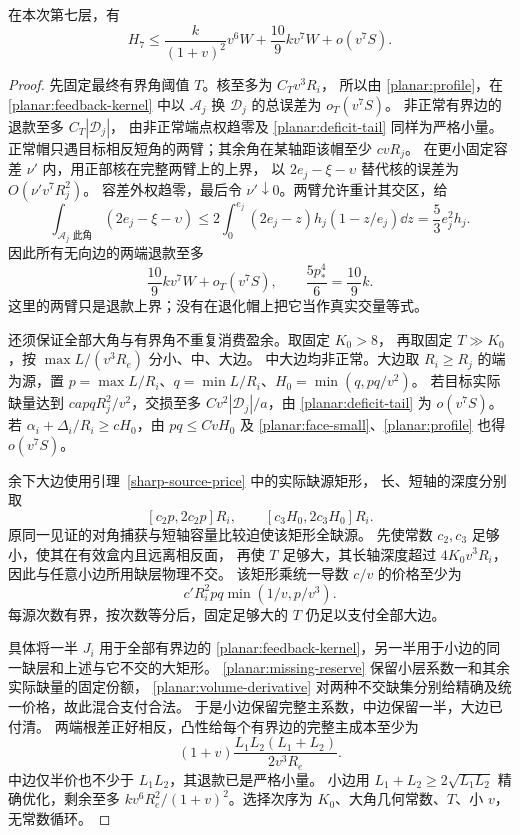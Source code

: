 \begin{lemma}[二维次阶局部价格]\label{planar:local-price}
在本次第七层，有
\begin{equation}\label{planar:price}
 H_7\le\frac{k}{(1+v)^2}v^6W+\frac{10}{9}kv^7W+o(v^7S).
\end{equation}
\end{lemma}
\begin{proof}
先固定最终有界角阈值 \(T\)。核至多为 \(C_Tv^3R_i\)，
所以由 \eqref{planar:profile}，在 \eqref{planar:feedback-kernel} 中以
\(\mathcal A_j\) 换 \(\mathscr D_j\) 的总误差为 \(o_T(v^7S)\)。
非正常有界边的退款至多 \(C_T|\mathscr D_j|\)，
由非正常端点权趋零及 \eqref{planar:deficit-tail} 同样为严格小量。
正常帽只遇目标相反短角的两臂；其余角在某轴距该帽至少 \(cvR_j\)。
在更小固定容差 \(\nu'\) 内，用正部核在完整两臂上的上界，
以 \(2e_j-\xi-\upsilon\) 替代核的误差为 \(O(\nu'v^7R_j^2)\)。
容差外权趋零，最后令 \(\nu'\downarrow0\)。两臂允许重计其交区，给
\[
 \int_{\mathcal A_j\text{ 此角}}(2e_j-\xi-\upsilon)
 \le2\int_0^{e_j}(2e_j-z)h_j(1-z/e_j)\dd z
 =\frac53e_j^2h_j.
\]
因此所有无向边的两端退款至多
\begin{equation}\label{planar:refund}
 \frac{10}{9}kv^7W+o_T(v^7S),
 \qquad \frac{5p_*^4}{6}=\frac{10}{9}k.
\end{equation}
这里的两臂只是退款上界；没有在退化帽上把它当作真实交量等式。

还须保证全部大角与有界角不重复消费盈余。取固定 \(K_0>8\)，
再取固定 \(T\gg K_0\)，按 \(\max L/(v^3R_e)\) 分小、中、大边。
中大边均非正常。大边取 \(R_i\ge R_j\) 的端为源，置
\(p=\max L/R_i\)、\(q=\min L/R_i\)、\(H_0=\min(q,pq/v^2)\)。
若目标实际缺量达到 \(c apqR_j^2/v^2\)，交损至多
\(Cv^2|\mathscr D_j|/a\)，由 \eqref{planar:deficit-tail} 为 \(o(v^7S)\)。
若 \(\alpha_i+\Delta_i/R_i\ge cH_0\)，由 \(pq\le CvH_0\) 及
\eqref{planar:face-small}、\eqref{planar:profile} 也得 \(o(v^7S)\)。

余下大边使用引理~\ref{sharp-source-price} 中的实际缺源矩形，
长、短轴的深度分别取
\[
 [c_2p,2c_2p]R_i,\qquad [c_3H_0,2c_3H_0]R_i.
\]
原同一见证的对角捕获与短轴容量比较迫使该矩形全缺源。
先使常数 \(c_2,c_3\) 足够小，使其在有效盒内且远离相反面，
再使 \(T\) 足够大，其长轴深度超过 \(4K_0v^3R_i\)，
因此与任意小边所用缺层物理不交。
该矩形乘统一导数 \(c/v\) 的价格至少为
\[
 c'R_i^2pq\min(1/v,p/v^3).
\]
每源次数有界，按次数等分后，固定足够大的 \(T\) 仍足以支付全部大边。

具体将一半 \(J_i\) 用于全部有界边的
\eqref{planar:feedback-kernel}，另一半用于小边的同一缺层和上述与它不交的大矩形。
\eqref{planar:missing-reserve} 保留小层系数一和其余实际缺量的固定份额，
\eqref{planar:volume-derivative} 对两种不交缺集分别给精确及统一价格，故此混合支付合法。
于是小边保留完整主系数，中边保留一半，大边已付清。
两端根差正好相反，凸性给每个有界边的完整主成本至少为
\[
 (1+v)\frac{L_1L_2(L_1+L_2)}{2v^3R_e}.
\]
中边仅半价也不少于 \(L_1L_2\)，其退款已是严格小量。
小边用 \(L_1+L_2\ge2\sqrt{L_1L_2}\) 精确优化，剩余至多
\(kv^6R_e^2/(1+v)^2\)。选择次序为 \(K_0\)、大角几何常数、\(T\)、小 \(v\)，无常数循环。


\end{proof}
